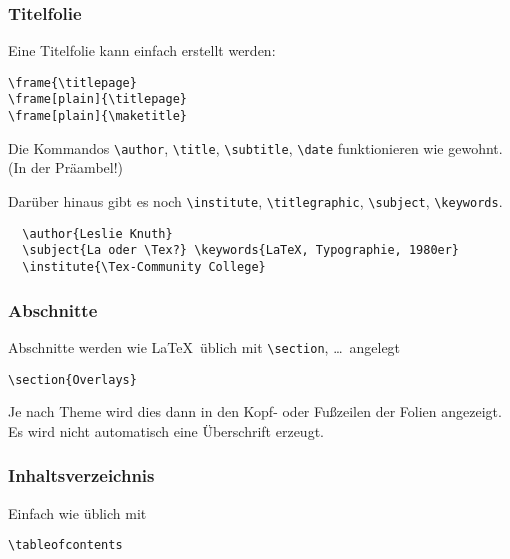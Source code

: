 \begin{slide}
  \frametitle{Titelfolie}

  Eine Titelfolie kann einfach erstellt werden:
\begin{lstlisting}
\frame{\titlepage}
\frame[plain]{\titlepage}
\frame[plain]{\maketitle}
\end{lstlisting}

  \onslide<+->

  Die Kommandos \lstinline{\author}, \lstinline{\title}, \lstinline{\subtitle},
  \lstinline{\date} funktionieren wie gewohnt. (In der Präambel!)

  \onslide<+->

  Darüber hinaus gibt es noch
  \lstinline{\institute}, \lstinline{\titlegraphic},
  \lstinline{\subject}, \lstinline{\keywords}.
\begin{lstlisting}
  \author{Leslie Knuth}
  \subject{La oder \Tex?} \keywords{LaTeX, Typographie, 1980er}
  \institute{\Tex-Community College}
\end{lstlisting}

\end{slide}

\begin{slide}
  \frametitle{Abschnitte}

  \onslide<+->

  Abschnitte werden wie \LaTeX\ üblich mit \lstinline{\section}, \dots\ angelegt

\begin{lstlisting}
\section{Overlays}
\end{lstlisting}

  \onslide<+->

  Je nach Theme wird dies dann in den Kopf- oder Fußzeilen der Folien angezeigt. Es wird nicht automatisch eine Überschrift erzeugt.
\end{slide}

\begin{slide}
  \frametitle{Inhaltsverzeichnis}


  Einfach wie üblich mit
\begin{lstlisting}
\tableofcontents
\end{lstlisting}


\end{slide}

